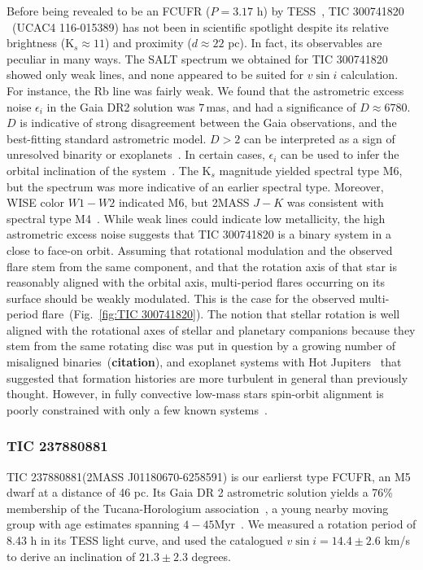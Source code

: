 \documentclass[fleqn,usenatbib,letters]{mnras}%
\newcommand{\FC}{TIC 237880881} %
\newcommand{\FF}{TIC 300741820} %
\begin{document}
Before being revealed to be an FCUFR ($P=3.17$ h) by TESS~\citep{zhan2019}, \FF\,~(UCAC4 116-015389) has not been in scientific spotlight despite its relative brightness (K$_s\approx11$) and proximity ($d\approx22$ pc). In fact, its observables are peculiar in many ways. The SALT spectrum we obtained for \FF\; showed only weak lines, and none appeared to be suited for $v \sin i$ calculation. For instance, the Rb line was fairly weak. We found that the astrometric excess noise $\epsilon_i$ in the Gaia DR2 solution was $7$\,mas, and had a significance of $D\approx6780$. $D$ is indicative of strong disagreement between the Gaia observations, and the best-fitting standard astrometric model. $D>2$ can be interpreted as a sign of unresolved binarity or exoplanets~\citep{lindegren2012}. In certain cases, $\epsilon_i$ can be used to infer the orbital inclination of the system~\citep{kiefer2019a, kiefer2019b}. The K$_s$ magnitude yielded spectral type M6, but the spectrum was more indicative of an earlier spectral type. Moreover, WISE color $W1-W2$ indicated M6, but 2MASS $J-K$ was consistent with spectral type M4~\citep{pecaut2013}. While weak lines could indicate low metallicity, the high astrometric excess noise suggests that \FF\; is a binary system in a close to face-on orbit. Assuming that rotational modulation and the observed flare stem from the same component, and that the rotation axis of that star is reasonably aligned with the orbital axis, multi-period flares occurring on its surface should be weakly modulated. This is the case for the observed multi-period flare~(Fig.~\ref{fig:\FF}). The notion that stellar rotation is well aligned with the rotational axes of stellar and planetary companions because they stem from the same rotating disc was put in question by a growing number of misaligned binaries~(\textbf{citation}), and exoplanet systems with Hot Jupiters~\citep{winn2010} that suggested that formation histories are more turbulent in general than previously thought. However, in fully convective low-mass stars spin-orbit alignment is poorly constrained with only a few known systems~\citep{konopacky2012, harding2013, zhang2020}.

\subsubsection{\FC}
\label{sec:propsC}
\FC\;(2MASS J01180670-6258591) is our earlierst type FCUFR, an M5 dwarf at a distance of 46 pc. Its Gaia DR 2 astrometric solution yields a 76\% membership of the Tucana-Horologium association~\citep{ujjwal2020}, a young nearby moving group with age estimates spanning $4-45$\;Myr~\citep{ujjwal2020, bell2015, kraus2014}. We measured a rotation period of 8.43 h in its TESS light curve, and used the catalogued $v\sin i=14.4\pm2.6$ km/s~\citep{kraus2014} to derive an inclination of $21.3\pm2.3$ degrees.
\end{document}
